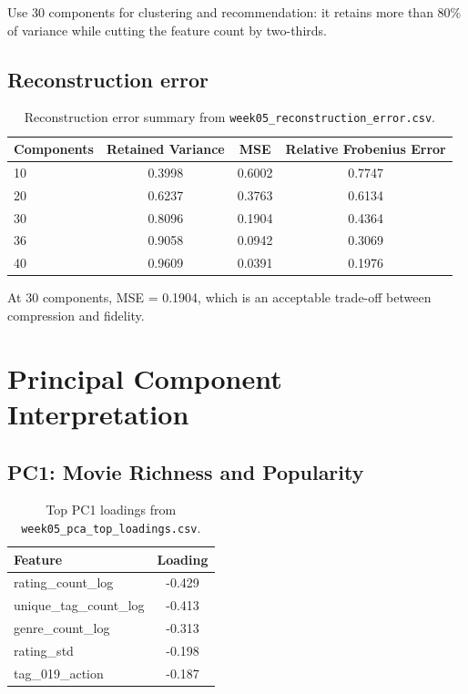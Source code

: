 \documentclass[11pt]{article}
\begin{document}
Use 30 components for clustering and recommendation: it retains more than 80\% of variance while cutting the feature count by two-thirds.

\subsection{Reconstruction error}

\begin{table}[H]
\centering
\begin{tabular}{lccc}
\toprule
Components & Retained Variance & MSE & Relative Frobenius Error \\
\midrule
10 & 0.3998 & 0.6002 & 0.7747 \\
20 & 0.6237 & 0.3763 & 0.6134 \\
30 & 0.8096 & 0.1904 & 0.4364 \\
36 & 0.9058 & 0.0942 & 0.3069 \\
40 & 0.9609 & 0.0391 & 0.1976 \\
\bottomrule
\end{tabular}
\caption{Reconstruction error summary from \texttt{week05\_reconstruction\_error.csv}.}
\end{table}

At 30 components, MSE = 0.1904, which is an acceptable trade-off between compression and fidelity.

\section{Principal Component Interpretation}

\subsection{PC1: Movie Richness and Popularity}

\begin{table}[H]
\centering
\begin{tabular}{lc}
\toprule
Feature & Loading \\
\midrule
rating\_count\_log & -0.429 \\
unique\_tag\_count\_log & -0.413 \\
genre\_count\_log & -0.313 \\
rating\_std & -0.198 \\
tag\_019\_action & -0.187 \\
\bottomrule
\end{tabular}
\caption{Top PC1 loadings from \texttt{week05\_pca\_top\_loadings.csv}.}
\end{table}
\end{document}
